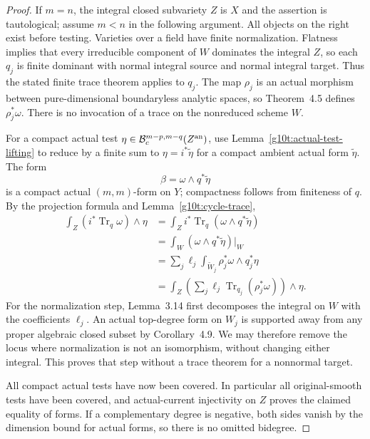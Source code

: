 \begin{proof}
If $m=n$, the integral closed subvariety $Z$ is $X$ and the
assertion is tautological; assume $m<n$ in the following argument.
All objects on the right exist before testing. Varieties over
a field have finite normalization. Flatness implies that every
irreducible component of $W$ dominates the integral $Z$, so
each $q_j$ is finite dominant with normal integral source and
normal integral target. Thus the stated finite trace theorem
applies to $q_j$. The map $\rho_j$ is an actual morphism
between pure-dimensional boundaryless analytic spaces, so
Theorem~4.5 defines $\rho_j^*\omega$. There is no invocation
of a trace on the nonreduced scheme $W$.

For a compact actual test
$\eta\in\mathcal B_c^{m-p,m-q}(Z^{\rm an})$, use
Lemma~\ref{g10t:actual-test-lifting} to reduce by a finite sum
to $\eta=i^*\widetilde\eta$ for a compact ambient actual
form $\widetilde\eta$. The form
\[
                  \beta=\omega\wedge q^*\widetilde\eta
\]
is a compact actual $(m,m)$-form on $Y$; compactness follows
from finiteness of $q$. By the projection formula and
Lemma~\ref{g10t:cycle-trace},
\[
 \begin{split}
 \int_Z (i^*\operatorname{Tr}_q\omega)\wedge\eta
   &=\int_Z i^*\operatorname{Tr}_q
                        (\omega\wedge q^*\widetilde\eta)\\
   &=\int_W(\omega\wedge q^*\widetilde\eta)|_W\\
   &=\sum_j\ell_j\int_{\widetilde W_j}
                        \rho_j^*\omega\wedge q_j^*\eta\\
   &=\int_Z\left(\sum_j\ell_j
                  \operatorname{Tr}_{q_j}(\rho_j^*\omega)\right)
                         \wedge\eta.
 \end{split}
\]
For the normalization step, Lemma~3.14 first decomposes the
integral on $W$ with the coefficients $\ell_j$. An actual
top-degree form on $W_j$ is supported away from any proper
algebraic closed subset by Corollary~4.9. We may therefore
remove the locus where normalization is not an isomorphism,
without changing either integral. This proves that step
without a trace theorem for a nonnormal target.

All compact actual tests have now been covered. In particular
all original-smooth tests have been covered, and actual-current
injectivity on $Z$ proves the claimed equality of forms.
If a complementary degree is negative, both sides vanish by
the dimension bound for actual forms, so there is no omitted
bidegree.
\end{proof}

